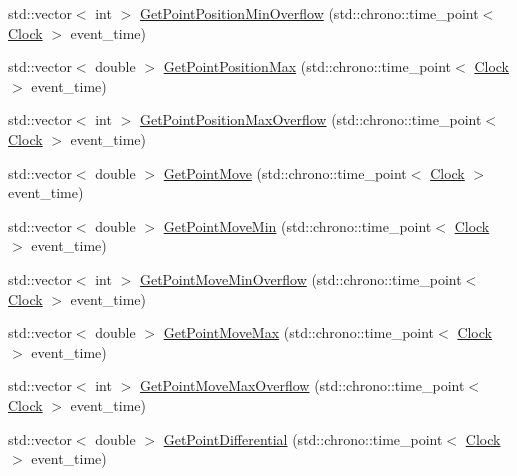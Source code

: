 \begin{DoxyCompactItemize}
\item 
std\+::vector$<$ int $>$ \mbox{\hyperlink{class_point_a3a0caf079555585799754b3cab12129c}{Get\+Point\+Position\+Min\+Overflow}} (std\+::chrono\+::time\+\_\+point$<$ \mbox{\hyperlink{universe_8h_a0ef8d951d1ca5ab3cfaf7ab4c7a6fd80}{Clock}} $>$ event\+\_\+time)
\item 
std\+::vector$<$ double $>$ \mbox{\hyperlink{class_point_afca47c5ea265894faf7b6aa4f4b17998}{Get\+Point\+Position\+Max}} (std\+::chrono\+::time\+\_\+point$<$ \mbox{\hyperlink{universe_8h_a0ef8d951d1ca5ab3cfaf7ab4c7a6fd80}{Clock}} $>$ event\+\_\+time)
\item 
std\+::vector$<$ int $>$ \mbox{\hyperlink{class_point_a228830fddb8b4d90e910e0774796e635}{Get\+Point\+Position\+Max\+Overflow}} (std\+::chrono\+::time\+\_\+point$<$ \mbox{\hyperlink{universe_8h_a0ef8d951d1ca5ab3cfaf7ab4c7a6fd80}{Clock}} $>$ event\+\_\+time)
\item 
std\+::vector$<$ double $>$ \mbox{\hyperlink{class_point_a46d06a6d5e8107a0321ede4ca162f264}{Get\+Point\+Move}} (std\+::chrono\+::time\+\_\+point$<$ \mbox{\hyperlink{universe_8h_a0ef8d951d1ca5ab3cfaf7ab4c7a6fd80}{Clock}} $>$ event\+\_\+time)
\item 
std\+::vector$<$ double $>$ \mbox{\hyperlink{class_point_a92d41c8cd9a07ef56223839a44f54fe8}{Get\+Point\+Move\+Min}} (std\+::chrono\+::time\+\_\+point$<$ \mbox{\hyperlink{universe_8h_a0ef8d951d1ca5ab3cfaf7ab4c7a6fd80}{Clock}} $>$ event\+\_\+time)
\item 
std\+::vector$<$ int $>$ \mbox{\hyperlink{class_point_a3c88bb9f80535e98fb0f479b69f75c64}{Get\+Point\+Move\+Min\+Overflow}} (std\+::chrono\+::time\+\_\+point$<$ \mbox{\hyperlink{universe_8h_a0ef8d951d1ca5ab3cfaf7ab4c7a6fd80}{Clock}} $>$ event\+\_\+time)
\item 
std\+::vector$<$ double $>$ \mbox{\hyperlink{class_point_af67ce3da60a8e3907df6ec193786c2ae}{Get\+Point\+Move\+Max}} (std\+::chrono\+::time\+\_\+point$<$ \mbox{\hyperlink{universe_8h_a0ef8d951d1ca5ab3cfaf7ab4c7a6fd80}{Clock}} $>$ event\+\_\+time)
\item 
std\+::vector$<$ int $>$ \mbox{\hyperlink{class_point_a83e3715d429ab2099f0c421d46603004}{Get\+Point\+Move\+Max\+Overflow}} (std\+::chrono\+::time\+\_\+point$<$ \mbox{\hyperlink{universe_8h_a0ef8d951d1ca5ab3cfaf7ab4c7a6fd80}{Clock}} $>$ event\+\_\+time)
\item 
std\+::vector$<$ double $>$ \mbox{\hyperlink{class_point_af3941d62b39234e468e201f25a37d9da}{Get\+Point\+Differential}} (std\+::chrono\+::time\+\_\+point$<$ \mbox{\hyperlink{universe_8h_a0ef8d951d1ca5ab3cfaf7ab4c7a6fd80}{Clock}} $>$ event\+\_\+time)

\end{DoxyCompactItemize}
